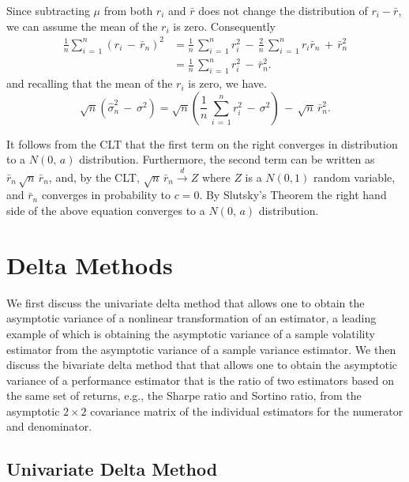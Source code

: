 \documentclass[graybox,envcountchap,sectrefs]{svmono}\usepackage[]{graphicx}\usepackage[]{xcolor}
\begin{document}
\begin{appendices}
Since subtracting $\mu$ from both $r_{i}$ and $\bar{r}$ does not
change the distribution of $r_{i}-\bar{r}$, we can assume the mean
of the $r_{i}$ is zero. Consequently
\begin{align*}
\frac{1}{n}\sum_{i\,=\,1}^{n}\left(r_{i}\,-\,\bar{r}_{n}\right)^{2} & =\frac{1}{n}\,\sum_{i\,=\,1}^{n}r_{i}^{2}\,-\,\frac{2}{n}\,\sum_{i\,=\,1}^{n}r_{i}\bar{r}_{n}\,+\,\bar{r}_{n}^{2}\\
 & =\frac{1}{n}\,\sum_{i\,=\,1}^{n}r_{i}^{2}\,-\,\bar{r}_{n}^{2}.
\end{align*}
and recalling that the mean of the $r_{i}$ is zero, we have.
\[
\sqrt{n}\left(\hat{\sigma}_{n}^{2}\,-\,\sigma^{2}\right)=\sqrt{n}\left(\frac{1}{n}\,\sum_{i\,=\,1}^{n}r_{i}^{2}\,-\,\sigma^{2}\right)\,-\,\sqrt{n}\,\bar{r}_{n}^{2}.
\]

It follows from the CLT that the first term on the right converges
in distribution to a $N(0,\,a)$ distribution. Furthermore, the second
term can be written as $\bar{r}_{n}\,\sqrt{n}\,\bar{r}_{n}$, and,
by the CLT, $\sqrt{n}\,\bar{r}_{n}\stackrel{d}{\rightarrow}Z$ where
$Z$ is a $N(0,1)$ random variable, and $\bar{r}_{n}$ converges
in probability to $c=0$. By Slutsky's Theorem the right hand side
of the above equation converges to a $N(0,\,a)$ distribution.

\textbf{}

\section{Delta Methods}

We first discuss the univariate delta method that allows one to obtain
the asymptotic variance of a nonlinear transformation of an estimator,
a leading example of which is obtaining the asymptotic variance of
a sample volatility estimator from the asymptotic variance of a sample
variance estimator. We then discuss the bivariate delta method that
that allows one to obtain the asymptotic variance of a performance
estimator that is the ratio of two estimators based on the same set
of returns, e.g., the Sharpe ratio and Sortino ratio, from the asymptotic
$2\times2$ covariance matrix of the individual estimators for the
numerator and denominator.

\subsection{Univariate Delta Method}


\end{appendices}
\end{document}
